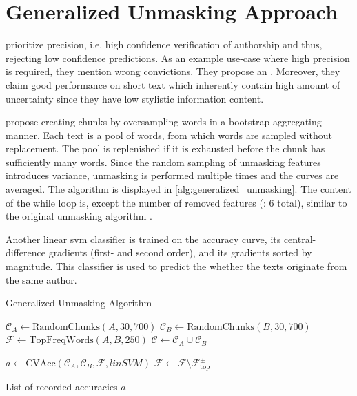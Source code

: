 \section{Generalized Unmasking Approach}
\label{sec:generalized_unmasking_approach}

\citet{bevendorff_generalizing_2019} prioritize precision, 
i.e. high confidence verification of authorship and thus, rejecting low confidence predictions.
As an example use-case where high precision is required, they mention wrong convictions.
They propose an . %
Moreover, they claim good performance on short text which inherently contain high amount of uncertainty since they have low stylistic information content.

\citet{bevendorff_generalizing_2019,bevendorff_divergence_based_2020} propose creating chunks by 
oversampling words in a bootstrap aggregating manner. 
Each text is a pool of words, from which words are sampled without replacement.
The pool is replenished if it is exhausted before the chunk has sufficiently many words.
Since the random sampling of unmasking features introduces variance, unmasking is performed multiple times and the curves are averaged.
The algorithm is displayed in \autoref{alg:generalized_unmasking}.
The content of the while loop is, except the number of removed features (\citep{koppel_authorship_2004}: 6 total), 
similar to the original unmasking algorithm \citep{koppel_authorship_2004}.

Another linear \ac{svm} classifier is trained on the accuracy curve, its central-difference gradients (first- and second order), 
and its gradients sorted by magnitude.
This classifier is used to predict the whether the texts originate from the same author.

\begin{algorithm}
    \caption{Generalized Unmasking Algorithm \citep{bevendorff_generalizing_2019,bevendorff_divergence_based_2020}}
    \label{alg:generalized_unmasking}
    \begin{algorithmic}[1]
    
        \State $\mathcal{C}_A \gets \text{RandomChunks}(A, 30, 700)$ 
        \State $\mathcal{C}_B \gets \text{RandomChunks}(B, 30, 700)$
        \State $\mathcal{F} \gets \text{TopFreqWords}(A, B, 250)$
        \State $\mathcal{C} \gets \mathcal{C}_A \cup \mathcal{C}_B$

        
        \State $a \gets \text{CVAcc}(\mathcal{C}_A, \mathcal{C}_B, \mathcal{F}, linSVM)$ 
        \State $\mathcal{F} \gets \mathcal{F} \setminus \mathcal{F}_{\text{top}}^{\pm}$ 
    
        \EndWhile
    
        \State \Return List of recorded accuracies $a$
    \EndProcedure
    \end{algorithmic}
\end{algorithm}

